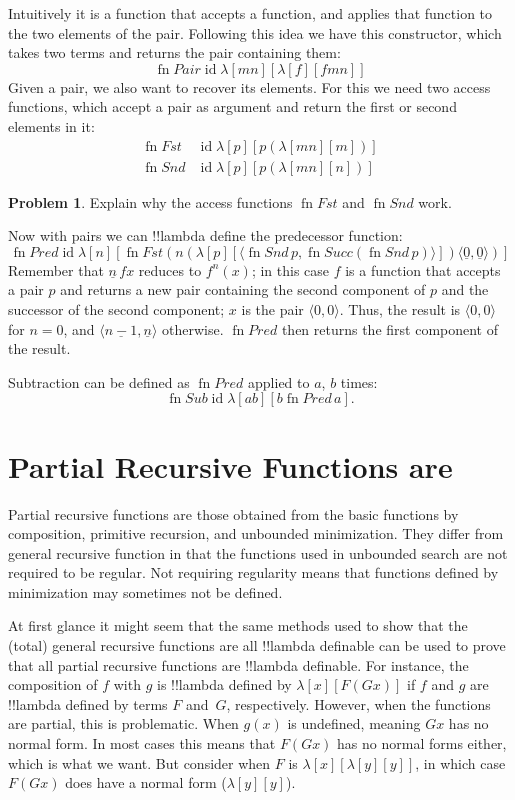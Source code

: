 \documentclass[10pt,a4paper]{article}
\theoremstyle{plain}
\theoremstyle{definition}
\newtheorem{prob}{Problem}[section]
\theoremstyle{remark}
\newcommand*{\olfileid}[3]{}
\newcommand*{\olsection}[1]{\section*{#1}}
\providecommand{\tuple}[1]{\langle #1 \rangle}
\providecommand{\num}[1]{\underline{#1}}
\providecommand{\lambd}{\ensuremath{\lambda}}
\providecommand{\ident}{\operatorname{id}}
\providecommand{\fn}{\operatorname{fn}}
\begin{document}
Intuitively it is a function that accepts a function, and applies that
function to the two elements of the pair. Following this idea we have
this constructor, which takes two terms and returns the pair containing
them:
\[
  \fn{Pair} \ident \lambd[mn][\lambd[f][fmn]]
\]
Given a pair, we also want to recover its elements.
For this we need two access functions, which accept a pair as argument and
return the first or second elements in it:
\begin{align*}
  \fn{Fst} & \ident \lambd[p][p(\lambd[mn][m])]\\
  \fn{Snd} & \ident \lambd[p][p(\lambd[mn][n])]
\end{align*}

\begin{prob}
  Explain why the access functions $\fn{Fst}$ and $\fn{Snd}$ work.
\end{prob}

Now with pairs we can !!{lambda define} the predecessor function:
\[
  \fn{Pred} \ident \lambd[n][\fn{Fst}(n (\lambd[p][\tuple{\fn{Snd}\, {p}, \fn{Succ}(\fn{Snd}\, {p})}]) \tuple{\num 0, \num 0})]
\]
Remember that $\num n\, f x$ reduces to $f^{n}(x)$; in this
case $f$ is a function that accepts a pair $p$ and returns a new
pair containing the second component of $p$ and the successor of the
second component; $x$ is the pair $\tuple{0,0}$. Thus, the
result is $\tuple{0,0}$ for $n=0$, and $\tuple{\num{n-1}, \num n}$
otherwise. $\fn{Pred}$ then returns the first component of the result.

Subtraction can be defined as $\fn{Pred}$ applied to $a$, $b$ times:
\[
\fn{Sub} \ident \lambd[ab][b \fn{Pred}\, a].
\]
    




\olfileid{lam}{ldf}{par}
\olsection{Partial Recursive Functions are \usetoken{S}{lambda definable}}

Partial recursive functions are those obtained from the basic
functions by composition, primitive recursion, and unbounded
minimization. They differ from general recursive function in that the
functions used in unbounded search are not required to be regular.
Not requiring regularity means that functions defined by minimization
may sometimes not be defined. 

At first glance it might seem that the same methods used to show that
the (total) general recursive functions are all !!{lambda definable} can
be used to prove that all partial recursive functions are
!!{lambda definable}.  For instance, the composition of $f$ with $g$ is
!!{lambda define}d by $\lambd[x][F (G x)]$ if $f$ and $g$ are
!!{lambda define}d by terms $F$ and~$G$, respectively. However, when the
functions are partial, this is problematic. When $g(x)$ is undefined,
meaning $G x$ has no normal form. In most cases this means that $F (G
x)$ has no normal forms either, which is what we want.  But consider
when $F$ is $\lambd[x][\lambd[y][y]]$, in which case $F (G x)$ does
have a normal form ($\lambd[y][y]$). 
\end{document}
